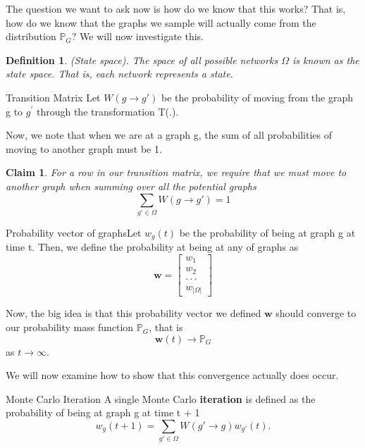 \documentclass[twoside]{article}
\newcommand{\prob}{\mathbb{P}}
\newtheorem{claim}[theorem]{Claim}
\newtheorem{definition}[theorem]{Definition}
\begin{document}
The question we want to ask now is how do we know that this works? That is, how do we know that the graphs we sample will actually come from the distribution $\prob_G?$ We will now investigate this.

\begin{definition}(State space). The space of all possible networks $\Omega$ is known as the state space. That is, each network represents a state.
\end{definition}

\begin{definition_exam}{Transition Matrix}{} Let $W(g \rightarrow g')$ be the probability of moving from the graph g to $g^{'}$ through the transformation T(.).
\end{definition_exam}

Now, we note that when we are at a graph g, the sum of all probabilities of moving to another graph must be 1.

\begin{claim}For a row in our transition matrix, we require that we must move to another graph when summing over all the potential graphs 
$$
\sum_{g' \in \Omega}W(g \rightarrow g') = 1
$$
\end{claim}

\begin{definition_exam}{Probability vector of graphs}{}Let $w_g(t)$ be the probability of being at graph g at time t. Then, we define the probability at being at any of graphs as
$$
\textbf{w} = \begin{bmatrix}
w_1\\
w_2\\
\cdot \cdot \cdot \\
w_{|\Omega|}
\end{bmatrix}
$$
\end{definition_exam}

Now, the big idea is that this probability vector we defined $\textbf{w}$ should converge to our probability mass function $\prob_G$, that is 
$$
\textbf{w}(t) \rightarrow \prob_G
$$
as $t \rightarrow \infty.$

We will now examine how to show that this convergence actually does occur.

\begin{definition_exam}{Monte Carlo Iteration}{}
A single Monte Carlo \textbf{iteration} is defined as the probability of being at graph g at time t + 1
$$
w_g(t + 1) = \sum_{g' \in \Omega}W(g' \rightarrow g)w_{g'}(t).
$$
\end{definition_exam}
\end{document}

